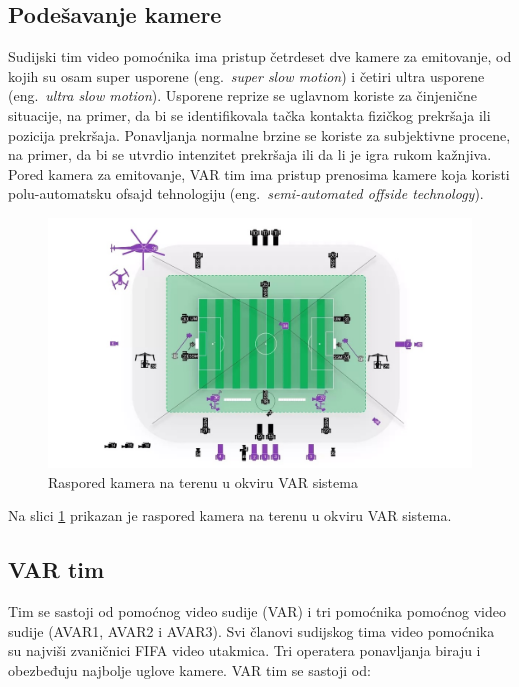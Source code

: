 \documentclass[a4paper]{article}
\begin{document}
\subsection{Podešavanje kamere}
Sudijski tim video pomoćnika ima pristup četrdeset dve kamere za emitovanje, od kojih su osam super usporene (eng.~{\em super slow motion}) i četiri ultra usporene (eng.~{\em ultra slow motion}). Usporene reprize se uglavnom koriste za činjenične situacije, na primer, da bi se identifikovala tačka kontakta fizičkog prekršaja ili pozicija prekršaja. Ponavljanja normalne brzine se koriste za subjektivne procene, na primer, da bi se utvrdio intenzitet prekršaja ili da li je igra rukom kažnjiva. Pored kamera za emitovanje, VAR tim ima pristup prenosima kamere koja koristi polu-automatsku ofsajd tehnologiju (eng.~{\em semi-automated offside technology}).


\begin{figure}[h!]
\begin{center}
\includegraphics[scale=0.35]{Var sistem.jpeg}
\end{center}
\caption{Raspored kamera na terenu u okviru VAR sistema}
\label{fig:kamere}
\end{figure}

Na slici \ref{fig:kamere} prikazan je raspored kamera na terenu u okviru VAR sistema.

\subsection{VAR tim}
Tim se sastoji od pomoćnog video sudije (VAR) i tri pomoćnika pomoćnog video sudije (AVAR1, AVAR2 i AVAR3). Svi članovi sudijskog tima video pomoćnika su najviši zvaničnici FIFA video utakmica.
Tri operatera ponavljanja biraju i obezbeđuju najbolje uglove kamere.
VAR tim se sastoji od: 
\end{document}
